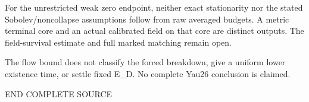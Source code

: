 \documentclass[
  10pt,
]{article}
\begin{document}
For the unrestricted weak zero endpoint, neither exact stationarity nor
the stated Sobolev/noncollapse assumptions follow from raw averaged
budgets. A metric terminal core and an actual calibrated field on that
core are distinct outputs. The field-survival estimate and full marked
matching remain open.

The flow bound does not classify the forced breakdown, give a uniform
lower existence time, or settle fixed E\_D. No complete Yau26 conclusion
is claimed.

END COMPLETE SOURCE
\end{document}
